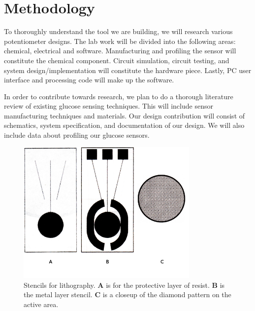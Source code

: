 \section{Methodology}

To thoroughly understand the tool we are building, we will research various potentiometer designs.
The lab work will be divided into the following areas: chemical, electrical and software. Manufacturing
and profiling the sensor will constitute the chemical component. Circuit simulation, circuit testing,
and system design/implementation will constitute the hardware piece. Lastly, PC user interface and
processing code will make up the software.

In order to contribute towards research, we plan to do a thorough literature review of existing glucose
sensing techniques. This will include sensor manufacturing techniques and materials. Our design
contribution will consist of schematics, system specification, and documentation of our design. We will
also include data about profiling our glucose sensors.

\begin{figure}[h]
\begin{center}
\includegraphics[width=3.5in]{../figures/stencils.png}
\end{center}
\caption{Stencils for lithography. {\bf A} is for the protective layer of resist. {\bf B} is the metal layer stencil. {\bf C} is a closeup of the diamond pattern on the active area.}
\end{figure}
